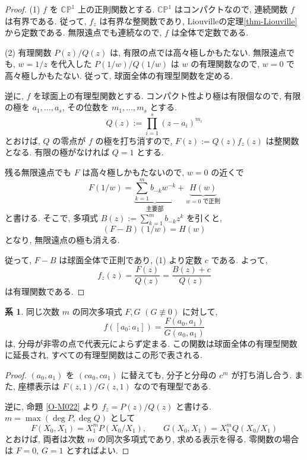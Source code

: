 \documentclass[dvipdfmx,a4paper,11pt]{article} %
\newcommand{\C}{\mathbb{C}}
\theoremstyle{definition}
\numberwithin{equation}{section}
\newtheorem{cor}[thm]{系}
\begin{document}
\begin{proof}
(1) $f$ を $\C\mathbb P^1$ 上の正則関数とする.
$\C\mathbb P^1$ はコンパクトなので, 連続関数 $f$ は有界である.
従って, $f_z$ は有界な整関数であり, Liouvilleの定理\ref{thm-Liouville}から定数である.
無限遠点でも連続なので, $f$ は全体で定数である.

(2) 有理関数 $P(z)/Q(z)$ は, 有限の点では高々極しかもたない.
無限遠点でも, $w=1/z$ を代入した
$P(1/w)/Q(1/w)$ は $w$ の有理関数なので,
$w=0$ で高々極しかもたない.
従って, 球面全体の有理型関数を定める.

逆に, $f$ を球面上の有理型関数とする.
コンパクト性より極は有限個なので,
有限の極を $a_1,\ldots,a_s$,
その位数を $m_1,\ldots,m_s$ とする.
\[
Q(z):=\prod_{i=1}^s(z-a_i)^{m_i}
\]
とおけば, $Q$ の零点が $f$ の極を打ち消すので,
$F(z):=Q(z)f_z(z)$ は整関数となる.
有限の極がなければ $Q=1$ とする.

残る無限遠点でも $F$ は高々極しかもたないので,
$w=0$ の近くで
\[
F(1/w)
=\underbrace{\sum_{k=1}^m b_{-k}w^{-k}}_{\text{主要部}}
+\underbrace{H(w)}_{\text{$w=0$ で正則}}
\]
と書ける.
そこで, 多項式 $B(z):=\sum_{k=1}^m b_{-k}z^k$ を引くと,
\[
(F-B)(1/w)=H(w)
\]
となり, 無限遠点の極も消える.

従って, $F-B$ は球面全体で正則であり,
(1) より定数 $c$ である.
よって,
\[
f_z(z)=\frac{F(z)}{Q(z)}
=\frac{B(z)+c}{Q(z)}
\]
は有理関数である.
\end{proof}


\begin{cor}\label{O-M023}
同じ次数 $m$ の同次多項式 $F,G$ $(G\not\equiv0)$ に対して,
\[
f([a_0:a_1])=\frac{F(a_0,a_1)}{G(a_0,a_1)}
\]
は, 分母が非零の点で代表元によらず定まる.
この関数は球面全体の有理型関数に延長され,
すべての有理型関数はこの形で表される.
\end{cor}
\begin{proof}
$(a_0,a_1)$ を $(ca_0,ca_1)$ に替えても,
分子と分母の $c^m$ が打ち消し合う.
また, 座標表示は $F(z,1)/G(z,1)$ なので有理型である.

逆に, 命題 \ref{O-M022} より $f_z=P(z)/Q(z)$ と書ける.
$m=\max(\deg P,\deg Q)$ として
\[
F(X_0,X_1)=X_1^mP(X_0/X_1),\qquad
G(X_0,X_1)=X_1^mQ(X_0/X_1)
\]
とおけば, 両者は次数 $m$ の同次多項式であり, 求める表示を得る.
零関数の場合は $F=0$, $G=1$ とすればよい.
\end{proof}
\end{document}
